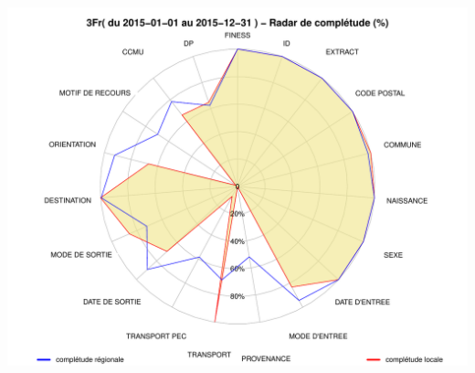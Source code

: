 \documentclass[]{article}
\begin{document}
\includegraphics{completude_files/figure-latex/finess-7.pdf}
\end{document}
